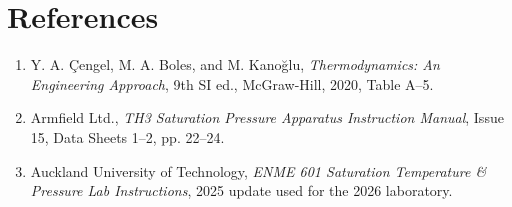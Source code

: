 \documentclass[11pt,a4paper]{article}
\begin{document}
\section*{References}
{\footnotesize
\begin{enumerate}[itemsep=0pt,topsep=2pt]
  \item Y. A. \c{C}engel, M. A. Boles, and M. Kano\u{g}lu,
  \emph{Thermodynamics: An Engineering Approach}, 9th SI ed., McGraw-Hill,
  2020, Table A--5.
  \item Armfield Ltd., \emph{TH3 Saturation Pressure Apparatus Instruction Manual},
  Issue 15, Data Sheets 1--2, pp. 22--24.
  \item Auckland University of Technology, \emph{ENME 601 Saturation Temperature
  \& Pressure Lab Instructions}, 2025 update used for the 2026 laboratory.
\end{enumerate}
}
\end{document}
